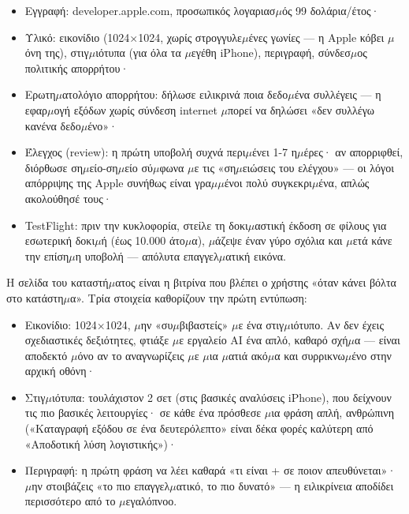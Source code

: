 \begin{itemize}
  \item Εγγραφή: developer.apple.com, προσωπικός λογαριασ$\mu$ός 99 δολάρια/έτος·
  \item Υλικό: εικονίδιο (1024×1024, χωρίς στρογγυλε$\mu$ένες γωνίες — η Apple κόβει $\mu$όνη της), στιγ$\mu$ιότυπα (για όλα τα $\mu$εγέθη iPhone), περιγραφή, σύνδεσ$\mu$ος πολιτικής απορρήτου·
  \item Ερωτη$\mu$ατολόγιο απορρήτου: δήλωσε ειλικρινά ποια δεδο$\mu$ένα συλλέγεις — η εφαρ$\mu$ογή εξόδων χωρίς σύνδεση internet $\mu$πορεί να δηλώσει «δεν συλλέγω κανένα δεδο$\mu$ένο»·
  \item Έλεγχος (review): η πρώτη υποβολή συχνά περι$\mu$ένει 1-7 η$\mu$έρες· αν απορριφθεί, διόρθωσε ση$\mu$είο-ση$\mu$είο σύ$\mu$φωνα $\mu$ε τις «ση$\mu$ειώσεις του ελέγχου» — οι λόγοι απόρριψης της Apple συνήθως είναι γρα$\mu$$\mu$ένοι πολύ συγκεκρι$\mu$ένα, απλώς ακολούθησέ τους·
  \item TestFlight: πριν την κυκλοφορία, στείλε τη δοκι$\mu$αστική έκδοση σε φίλους για εσωτερική δοκι$\mu$ή (έως 10.000 άτο$\mu$α), $\mu$άζεψε έναν γύρο σχόλια και $\mu$ετά κάνε την επίση$\mu$η υποβολή — απόλυτα επαγγελ$\mu$ατική εικόνα.
\end{itemize}


Η σελίδα του καταστή$\mu$ατος είναι η βιτρίνα που βλέπει ο χρήστης «όταν κάνει βόλτα στο κατάστη$\mu$α». Τρία στοιχεία καθορίζουν την πρώτη εντύπωση:

\begin{itemize}
  \item Εικονίδιο: 1024×1024, $\mu$ην «συ$\mu$βιβαστείς» $\mu$ε ένα στιγ$\mu$ιότυπο. Αν δεν έχεις σχεδιαστικές δεξιότητες, φτιάξε $\mu$ε εργαλείο AI ένα απλό, καθαρό σχή$\mu$α — είναι αποδεκτό $\mu$όνο αν το αναγνωρίζεις $\mu$ε $\mu$ια $\mu$ατιά ακό$\mu$α και συρρικνω$\mu$ένο στην αρχική οθόνη·
  \item Στιγ$\mu$ιότυπα: τουλάχιστον 2 σετ (στις βασικές αναλύσεις iPhone), που δείχνουν τις πιο βασικές λειτουργίες· σε κάθε ένα πρόσθεσε $\mu$ια φράση απλή, ανθρώπινη («Καταγραφή εξόδου σε ένα δευτερόλεπτο» είναι δέκα φορές καλύτερη από «Αποδοτική λύση λογιστικής»)·
  \item Περιγραφή: η πρώτη φράση να λέει καθαρά «τι είναι + σε ποιον απευθύνεται»· $\mu$ην στοιβάζεις «το πιο επαγγελ$\mu$ατικό, το πιο δυνατό» — η ειλικρίνεια αποδίδει περισσότερο από το $\mu$εγαλόπνοο.
\end{itemize}

